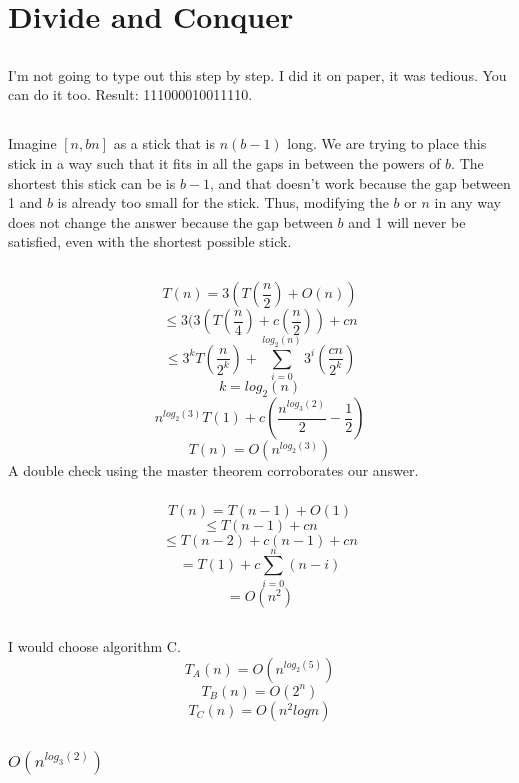 \documentclass{article}
\begin{document}
\section{Divide and Conquer}
\subsection{}I'm not going to type out this step by step. I did it on paper, it was tedious. You can do it too. Result: 111000010011110.
\subsection{}Imagine $[n, bn]$ as a stick that is $n(b-1)$ long. We are trying to place this stick in a way such that it fits in all the gaps in between the powers of $b$. The shortest this stick can be is $b-1$, and that doesn't work because the gap between 1 and $b$ is already too small for the stick. Thus, modifying the $b$ or $n$ in any way does not change the answer because the gap between $b$ and 1 will never be satisfied, even with the shortest possible stick. 
\subsection{}
\subsubsection{}
$$T(n)=3(T(\frac{n}{2})+O(n))$$
$$\leq 3(3(T(\frac{n}{4})+c(\frac{n}{2}))+cn$$
$$\leq 3^kT(\frac{n}{2^k})+\sum_{i=0}^{log_2(n)}3^i(\frac{cn}{2^k})$$
$$k=log_2(n)$$
$$n^{log_2(3)}T(1)+c(\frac{n^{log_3(2)}}{2}-\frac{1}{2})$$
$$T(n) = O(n^{log_2(3)})$$
A double check using the master theorem corroborates our answer. 
\subsubsection{}
$$T(n)=T(n-1)+O(1)$$
$$\leq T(n-1) + cn$$
$$\leq T(n-2) + c(n-1) + cn$$
$$=T(1) + c \sum_{i=0}^n(n - i)$$
$$=O(n^2)$$
\subsection{}
I would choose algorithm C. 
$$T_A(n)=O(n^{log_2(5)})$$
$$T_B(n)=O(2^n)$$
$$T_C(n)=O(n^2logn)$$
\subsection{}
\subsubsection{$O(n^{log_3(2)})$}
\end{document}

